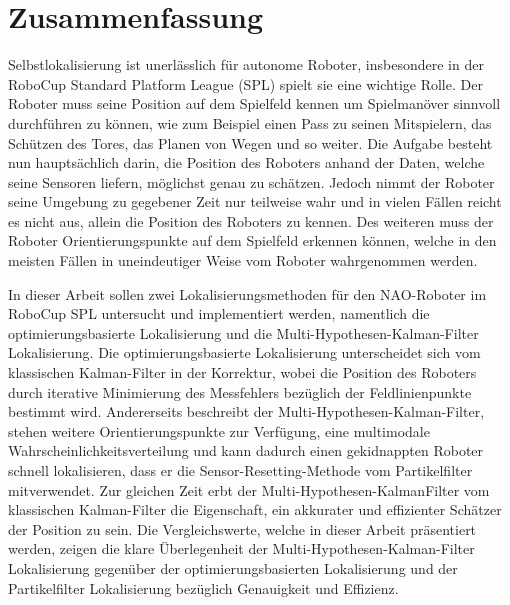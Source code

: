 \thispagestyle{empty}

\chapter*{Zusammenfassung}

Selbstlokalisierung ist unerl{\"a}sslich f{\"u}r autonome Roboter, insbesondere in der RoboCup Standard Platform League (SPL) spielt sie eine wichtige Rolle. Der Roboter muss seine Position auf dem Spielfeld kennen um Spielman{\"o}ver sinnvoll durchf{\"u}hren zu k{\"o}nnen, wie zum Beispiel einen Pass zu seinen Mitspielern, das Sch{\"u}tzen des Tores, das Planen von Wegen und so weiter. Die Aufgabe besteht nun haupts{\"a}chlich darin, die Position des Roboters anhand der Daten, welche seine Sensoren liefern, m{\"o}glichst genau zu sch{\"a}tzen. Jedoch nimmt der Roboter seine Umgebung zu gegebener Zeit nur teilweise wahr und in vielen F{\"a}llen reicht es nicht aus, allein die Position des Roboters zu kennen. Des weiteren muss der Roboter Orientierungspunkte auf dem Spielfeld erkennen k{\"o}nnen, welche in den meisten F{\"a}llen in uneindeutiger Weise vom Roboter wahrgenommen werden.

In dieser Arbeit sollen zwei Lokalisierungsmethoden f{\"u}r den NAO-Roboter im RoboCup SPL untersucht und implementiert werden, namentlich die optimierungsbasierte Lokalisierung und die Multi-Hypothesen-Kalman-Filter Lokalisierung. Die optimierungsbasierte Lokalisierung unterscheidet sich vom klassischen Kalman-Filter in der Korrektur, wobei die Position des Roboters durch iterative Minimierung des Messfehlers bez{\"u}glich der Feldlinienpunkte bestimmt wird. Andererseits beschreibt der Multi-Hypot\-hesen-Kalman-Filter, stehen weitere Orientierungspunkte zur Verf{\"u}gung, eine multimodale Wahrscheinlichkeitsverteilung und kann dadurch einen gekidnappten Roboter schnell lokalisieren, dass er die Sensor-Resetting-Methode vom Partikelfilter mitverwendet. Zur gleichen Zeit erbt der Multi-Hypothesen-KalmanFilter vom klassischen Kalman-Filter die Eigenschaft, ein akkurater und effizienter Sch{\"a}tzer der Position zu sein. Die Vergleichswerte, welche in dieser Arbeit pr{\"a}sentiert werden, zeigen die klare {\"U}berlegenheit der Multi-Hypothesen-Kalman-Filter Lokalisierung gegen{\"u}ber der optimierungsbasierten Lokalisierung und der Partikelfilter Lokalisierung bez{\"u}glich Genauigkeit und Effizienz.
